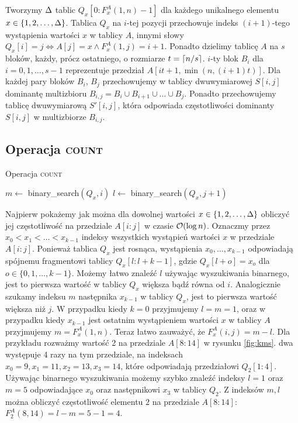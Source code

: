 Tworzymy $\Delta$ tablic $Q_x[0:F^A_x(1,n)-1]$ dla każdego unikalnego elementu $x \in \{1,2,\dots,\Delta\}$. Tablica $Q_x$ na $i$-tej pozycji przechowuje indeks $(i+1)$-tego wystąpienia wartości $x$ w tablicy $A$, innymi słowy $Q_x[i] = j \Longleftrightarrow A[j] = x \land F^A_x(1,j) = i+1$. Ponadto dzielimy tablicę $A$ na $s$ bloków, każdy, prócz ostatniego, o rozmiarze $t=\left\lceil n/s\right\rceil$. $i$-ty blok $B_i$ dla $i=0,1,\dots,s-1$ reprezentuje przedział $A[it+1, \min(n,(i+1)t)]$. Dla każdej pary bloków $B_i$, $B_j$ przechowujemy w tablicy dwuwymiarowej $S[i,j]$ dominantę multizbioru $B_{i,j} = B_i \cup B_{i+1} \cup \dots \cup B_{j}$. Ponadto przechowujemy tablicę dwuwymiarową $S'[i,j]$, która odpowiada częstotliwości dominanty $S[i,j]$ w multizbiorze $B_{i,j}$.
\subsection{Operacja \textsc{count}}
\begin{algorithm}
    \caption{Operacja \textsc{count}}
    \label{alg:kms-count}
    \begin{algorithmic}[1]
            \State $m \gets$ binary\_search$(Q_x, i)$
            \State $l \gets$ binary\_search$(Q_x, j+1)$
            \State {}
        \EndFunction
    \end{algorithmic}
\end{algorithm}
Najpierw pokażemy jak można dla dowolnej wartości $x \in \{1, 2, \dots, \Delta\}$ obliczyć jej częstotliwość na przedziale $A[i:j]$ w czasie $\mathcal{O}(\log n)$. Oznaczmy przez $x_0 < x_1 < \dots < x_{k-1}$ indeksy wszystkich wystąpień wartości $x$ w przedziale $A[i:j]$. Ponieważ tablica $Q_x$ jest rosnąca, wystąpienia $x_0,\dots,x_{k-1}$ odpowiadają spójnemu fragmentowi tablicy $Q_x[l:l+k-1]$, gdzie $Q_x[l+o] = x_o$ dla $o\in\{0,1,\dots,k-1\}$. Możemy łatwo znaleźć $l$ używając wyszukiwania binarnego, jest to pierwsza wartość w tablicy $Q_x$ większa bądź równa od $i$. Analogicznie szukamy indeksu $m$ następnika $x_{k-1}$ w tablicy $Q_x$, jest to pierwsza wartość większa niż $j$. W przypadku kiedy $k=0$ przyjmujemy $l=m=1$, oraz w przypadku kiedy $x_{k-1}$ jest ostatnim wystąpieniem wartości $x$ w tablicy $A$ przyjmujemy $m=F^A_x(1,n)$. Teraz łatwo zauważyć, że $F^A_x(i,j) = m-l$. Dla przykładu rozważmy wartość 2 na przedziale $A[8:14]$ w rysunku \ref{fig:kms}. dwa występuje 4 razy na tym przedziale, na indeksach $x_0=9,x_1=11,x_2=13,x_3=14$, które odpowiadają przedziałowi $Q_2[1:4]$. Używając binarnego wyszukiwania możemy szybko znaleźć indeksy $l=1$ oraz $m=5$ odpowiadające $x_0$ oraz następnikowi $x_3$ w tablicy $Q_2$. Z indeksów $m, l$ można obliczyć częstotliwość elementu $2$ na przedziale $A[8:14]$: $F^A_2(8,14)=l-m=5-1=4$.

